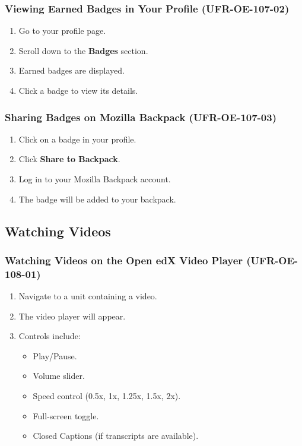 \subsubsection{Viewing Earned Badges in Your Profile (UFR-OE-107-02)}
\begin{enumerate}
    \item Go to your profile page.
    \item Scroll down to the \textbf{Badges} section.
    \item Earned badges are displayed.
    \item Click a badge to view its details.
\end{enumerate}

\subsubsection{Sharing Badges on Mozilla Backpack (UFR-OE-107-03)}
\begin{enumerate}
    \item Click on a badge in your profile.
    \item Click \textbf{Share to Backpack}.
    \item Log in to your Mozilla Backpack account.
    \item The badge will be added to your backpack.
\end{enumerate}

\subsection{Watching Videos}

\subsubsection{Watching Videos on the Open edX Video Player (UFR-OE-108-01)}
\begin{enumerate}
    \item Navigate to a unit containing a video.
    \item The video player will appear.
    \item Controls include:
    \begin{itemize}
        \item Play/Pause.
        \item Volume slider.
        \item Speed control (0.5x, 1x, 1.25x, 1.5x, 2x).
        \item Full-screen toggle.
        \item Closed Captions (if transcripts are available).
    \end{itemize}
\end{enumerate}

